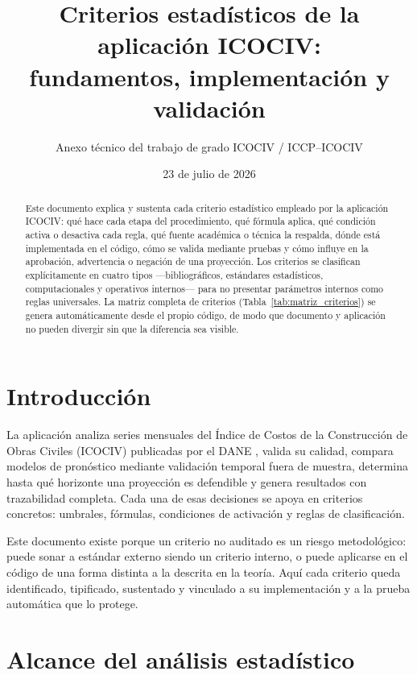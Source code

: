 \documentclass[12pt]{article}
\title{Criterios estad\'isticos de la aplicaci\'on ICOCIV:\\
fundamentos, implementaci\'on y validaci\'on}
\author{Anexo t\'ecnico del trabajo de grado ICOCIV / ICCP--ICOCIV}
\date{23 de julio de 2026}
\begin{document}
\maketitle

\begin{abstract}
Este documento explica y sustenta cada criterio estad\'istico empleado por la aplicaci\'on ICOCIV: qu\'e hace cada etapa del procedimiento, qu\'e f\'ormula aplica, qu\'e condici\'on activa o desactiva cada regla, qu\'e fuente acad\'emica o t\'ecnica la respalda, d\'onde est\'a implementada en el c\'odigo, c\'omo se valida mediante pruebas y c\'omo influye en la aprobaci\'on, advertencia o negaci\'on de una proyecci\'on. Los criterios se clasifican expl\'icitamente en cuatro tipos ---bibliogr\'aficos, est\'andares estad\'isticos, computacionales y operativos internos--- para no presentar par\'ametros internos como reglas universales. La matriz completa de criterios (Tabla~\ref{tab:matriz_criterios}) se genera autom\'aticamente desde el propio c\'odigo, de modo que documento y aplicaci\'on no pueden divergir sin que la diferencia sea visible.
\end{abstract}

\tableofcontents
\newpage

\section{Introducci\'on}
\label{sec:introduccion}

La aplicaci\'on analiza series mensuales del \'Indice de Costos de la Construcci\'on de Obras Civiles (ICOCIV) publicadas por el DANE \citep{dane_ficha_icociv,dane2021metodologia}, valida su calidad, compara modelos de pron\'ostico mediante validaci\'on temporal fuera de muestra, determina hasta qu\'e horizonte una proyecci\'on es defendible y genera resultados con trazabilidad completa. Cada una de esas decisiones se apoya en criterios concretos: umbrales, f\'ormulas, condiciones de activaci\'on y reglas de clasificaci\'on.

Este documento existe porque un criterio no auditado es un riesgo metodol\'ogico: puede sonar a est\'andar externo siendo un criterio interno, o puede aplicarse en el c\'odigo de una forma distinta a la descrita en la teor\'ia. Aqu\'i cada criterio queda identificado, tipificado, sustentado y vinculado a su implementaci\'on y a la prueba autom\'atica que lo protege.

\section{Alcance del an\'alisis estad\'istico}
\label{sec:alcance}
\end{document}
